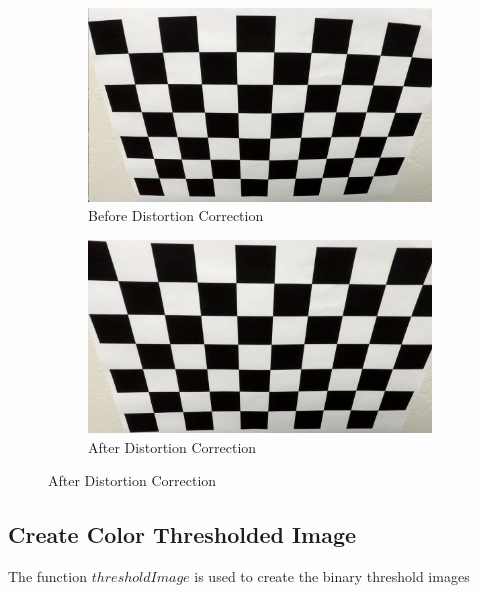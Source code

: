\documentclass{article}
\begin{document}
\begin{figure}
     \centering
     \begin{subfigure}[b]{0.4\textwidth}
         \centering
         \includegraphics[width=\textwidth]{../camera_cal/calibration2.jpg}
         \caption{Before Distortion Correction}
         \label{fig:1a}
     \end{subfigure}
     \hfill
     \begin{subfigure}[b]{0.4\textwidth}
         \centering
         \includegraphics[width=\textwidth]{../output_images/undistort/alibration2.jpg}
         \caption{After Distortion Correction}
         \label{fig:1b}
     \end{subfigure}
\end{figure}
\subsection{Create Color Thresholded Image} 
The function $thresholdImage$ is used to create the binary threshold images
\end{document}
